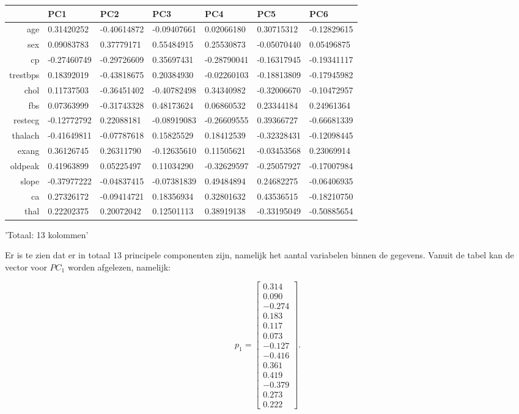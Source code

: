 \documentclass[11pt]{article}
\begin{document}
    \begin{tabular}{r|llllll}
  & PC1 & PC2 & PC3 & PC4 & PC5 & PC6\\
\hline
	age &  0.31420252 & -0.40614872 & -0.09407661 &  0.02066180 &  0.30715312 & -0.12829615\\
	sex &  0.09083783 &  0.37779171 &  0.55484915 &  0.25530873 & -0.05070440 &  0.05496875\\
	cp & -0.27460749 & -0.29726609 &  0.35697431 & -0.28790041 & -0.16317945 & -0.19341117\\
	trestbps &  0.18392019 & -0.43818675 &  0.20384930 & -0.02260103 & -0.18813809 & -0.17945982\\
	chol &  0.11737503 & -0.36451402 & -0.40782498 &  0.34340982 & -0.32006670 & -0.10472957\\
	fbs &  0.07363999 & -0.31743328 &  0.48173624 &  0.06860532 &  0.23344184 &  0.24961364\\
	restecg & -0.12772792 &  0.22088181 & -0.08919083 & -0.26609555 &  0.39366727 & -0.66681339\\
	thalach & -0.41649811 & -0.07787618 &  0.15825529 &  0.18412539 & -0.32328431 & -0.12098445\\
	exang &  0.36126745 &  0.26311790 & -0.12635610 &  0.11505621 & -0.03453568 &  0.23069914\\
	oldpeak &  0.41963899 &  0.05225497 &  0.11034290 & -0.32629597 & -0.25057927 & -0.17007984\\
	slope & -0.37977222 & -0.04837415 & -0.07381839 &  0.49484894 &  0.24682275 & -0.06406935\\
	ca &  0.27326172 & -0.09414721 &  0.18356934 &  0.32801632 &  0.43536515 & -0.18210750\\
	thal &  0.22202375 &  0.20072042 &  0.12501113 &  0.38919138 & -0.33195049 & -0.50885654\\
\end{tabular}


    
    'Totaal: 13 kolommen'

    
    Er is te zien dat er in totaal \(13\) principele componenten zijn,
namelijk het aantal variabelen binnen de gegevens. Vanuit de tabel kan
de vector voor \(PC_1\) worden afgelezen, namelijk:

\[ p_1 = \begin{bmatrix} 0.314 \\ 0.090 \\ -0.274 \\ 0.183 \\ 0.117 \\ 0.073 \\ -0.127 \\ -0.416 \\ 0.361 \\ 0.419 \\ -0.379 \\ 0.273 \\ 0.222 \end{bmatrix}. \]
\end{document}
